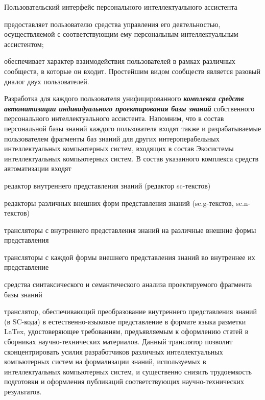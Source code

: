 \begin{textitemize}
	Пользовательский интерфейс персонального интеллектуального ассистента
	\begin{textitemize}
		\item предоставляет пользователю средства управления его  деятельностью, осуществляемой  с соответствующим ему персональным интеллектуальным ассистентом;
		\item обеспечивает  характер взаимодействия пользователей в рамках различных сообществ, в которые он входит. Простейшим видом сообществ является разовый диалог двух пользователей.
	\end{textitemize}
	\item
	Разработка для каждого пользователя унифицированного \textbf{\textit{комплекса средств автоматизации индивидуального проектирования базы знаний}} собственного персонального интеллектуального ассистента. Напомним, что в состав персональной базы знаний каждого пользователя входят также и разрабатываемые пользователем фрагменты баз знаний для других интероперабельных интеллектуальных компьютерных систем, входящих в состав Экосистемы интеллектуальных компьютерных систем. В состав указанного комплекса средств автоматизации входят
	\begin{textitemize}
		\item редактор внутреннего представления знаний (редактор sc-текстов)
		\item редакторы различных внешних форм представления знаний (sc.g-текстов, sc.n-текстов)
		\item трансляторы с внутреннего представления знаний на различные внешние формы представления
		\item трансляторы с каждой формы внешнего представления знаний во внутреннее их представление
		\item средства синтаксического и семантического анализа проектируемого фрагмента базы знаний
		\item транслятор, обеспечивающий преобразование внутреннего представления знаний (в SC-кода) в естествен\-но-языковое представление в формате языка разметки LaTex, удостоверяющее требованиям, предъявляемым к оформлению статей в сборниках научно-технических материалов. Данный транслятор позволит сконцентрировать усилия разработчиков различных интеллектуальных компьютерных систем на формализации знаний, используемых в интеллектуальных компьютерных систем, и существенно снизить трудоемкость подготовки и оформления публикаций соответствующих научно-технических результатов.\\

\end{textitemize}
\end{textitemize}
